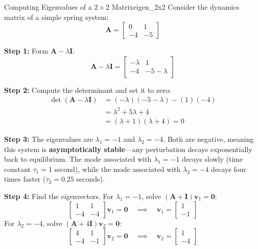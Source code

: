 \begin{example}{Computing Eigenvalues of a \texorpdfstring{$2 \times 2$}{2x2} Matrix}{eigen_2x2}
Consider the dynamics matrix of a simple spring system:
\begin{equation}
    \mathbf{A} = \begin{bmatrix} 0 & 1 \\ -4 & -5 \end{bmatrix}
\end{equation}

\textbf{Step 1:} Form $\mathbf{A} - \lambda \mathbf{I}$:
\begin{equation}
    \mathbf{A} - \lambda \mathbf{I} = \begin{bmatrix} -\lambda & 1 \\ -4 & -5 - \lambda \end{bmatrix}
\end{equation}

\textbf{Step 2:} Compute the determinant and set it to zero:
\begin{align}
    \det(\mathbf{A} - \lambda \mathbf{I}) &= (-\lambda)(-5 - \lambda) - (1)(-4) \\
    &= \lambda^2 + 5\lambda + 4 \\
    &= (\lambda + 1)(\lambda + 4) = 0
\end{align}

\textbf{Step 3:} The eigenvalues are $\lambda_1 = -1$ and $\lambda_2 = -4$. Both are negative, meaning this system is \textbf{asymptotically stable}---any perturbation decays exponentially back to equilibrium. The mode associated with $\lambda_1 = -1$ decays slowly (time constant $\tau_1 = 1$ second), while the mode associated with $\lambda_2 = -4$ decays four times faster ($\tau_2 = 0.25$ seconds).

\textbf{Step 4:} Find the eigenvectors. For $\lambda_1 = -1$, solve $(\mathbf{A} + \mathbf{I})\mathbf{v}_1 = \mathbf{0}$:
\begin{equation}
    \begin{bmatrix} 1 & 1 \\ -4 & -4 \end{bmatrix} \mathbf{v}_1 = \mathbf{0} \quad \implies \quad \mathbf{v}_1 = \begin{bmatrix} 1 \\ -1 \end{bmatrix}
\end{equation}
For $\lambda_2 = -4$, solve $(\mathbf{A} + 4\mathbf{I})\mathbf{v}_2 = \mathbf{0}$:
\begin{equation}
    \begin{bmatrix} 4 & 1 \\ -4 & -1 \end{bmatrix} \mathbf{v}_2 = \mathbf{0} \quad \implies \quad \mathbf{v}_2 = \begin{bmatrix} 1 \\ -4 \end{bmatrix}
\end{equation}
\end{example}

